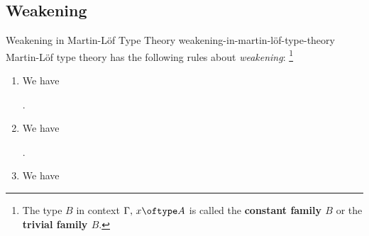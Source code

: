 \subsection{Weakening}\label{subsection-weakening-in-martin-löf-type-theory}
\begin{definition}{Weakening in Martin-Löf Type Theory \rmVII}{weakening-in-martin-löf-type-theory}%
    Martin-Löf type theory has the following rules about \textit{weakening}:%
    \footnote{%
        The type $B$ in context $\Gamma,\,x\oftype A$ is called the \textbf{constant family $B$} or the \textbf{trivial family $B$}.
        \par\vspace*{\TCBBoxCorrection}
    }%
    \begin{enumerate}
        \item\label{weakening-in-martin-löf-type-theory-weakening-for-types}We have
            \begin{webprooftree}%
                \begin{prooftree}%
                \end{prooftree}%
                .%
            \end{webprooftree}%
        \item\label{weakening-in-martin-löf-type-theory-weakening-for-terms}We have
            \begin{webprooftree}%
                \begin{prooftree}%
                \end{prooftree}%
                .%
            \end{webprooftree}%
        \item\label{weakening-in-martin-löf-type-theory-weakening-for-judgemental-equality-of-types}We have
            \begin{webprooftree}%
                \begin{prooftree}%

\end{prooftree}
\end{webprooftree}
\end{enumerate}
\end{definition}
